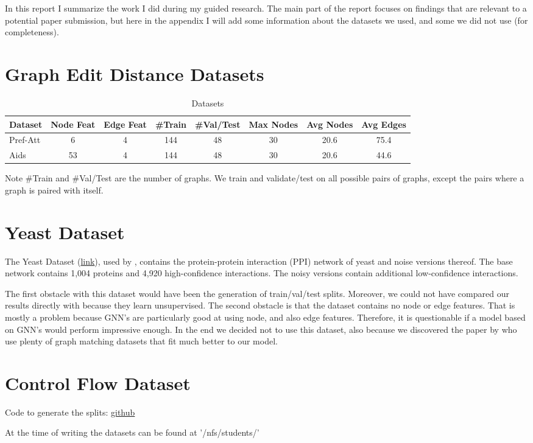 \appendix
\appendixpage

In this report I summarize the work I did during my guided research. The main part of the report focuses on findings that are relevant to a potential paper submission, but here in the appendix I will add some information about the datasets we used, and some we did not use (for completeness).


\section{Graph Edit Distance Datasets}
\begin{table}[htbp]
    \addtolength{\tabcolsep}{-1pt}
    \fontsize{9pt}{10.25pt}\selectfont
    \centering
    \renewcommand{\arraystretch}{1.2}
    \begin{tabular}{|l|c|c|c|c|c|c|c|}
        \hline
        Dataset & Node Feat & Edge Feat & \#Train & \#Val/Test & Max Nodes & Avg Nodes & Avg Edges \\
        \hline
        Pref-Att & 6 & 4 & 144 & 48 & 30 & 20.6 & 75.4 \\ %
        \hline
        Aids & 53 & 4 & 144 & 48 & 30 & 20.6 & 44.6 \\ %
        \hline
    \end{tabular}
    \caption{Datasets}
    \label{tab:ex1-data}
\end{table}

Note \#Train and \#Val/Test are the number of graphs. We train and validate/test on all possible pairs of graphs, except the pairs where a graph is paired with itself.

\section{Yeast Dataset}

The Yeast Dataset (\href{https://www3.nd.edu/~cone/MAGNA++/}{link}), used by \cite{yeast2019}, contains the protein-protein interaction (PPI) network of yeast and noise versions thereof. The base network contains 1,004 proteins and 4,920 high-confidence interactions. The noisy versions contain additional low-confidence interactions.

The first obstacle with this dataset would have been the generation of train/val/test splits.  Moreover, we could not have compared our results directly with \cite{yeast2019} because they learn unsupervised. The second obstacle is that the dataset contains no node or edge features. That is mostly a problem because GNN's are particularly good at using node, and also edge features. Therefore, it is questionable if a  model based on GNN's would perform impressive enough. In the end we decided not to use this dataset, also because we discovered the paper by \cite{fey2020_update} who use plenty of graph matching datasets that fit much better to our model.

\section{Control Flow Dataset}

Code to generate the splits: \href{https://github.com/johannespitz/functionsimsearch/tree/master}{github}

At the time of writing the datasets can be found at '/nfs/students/'
